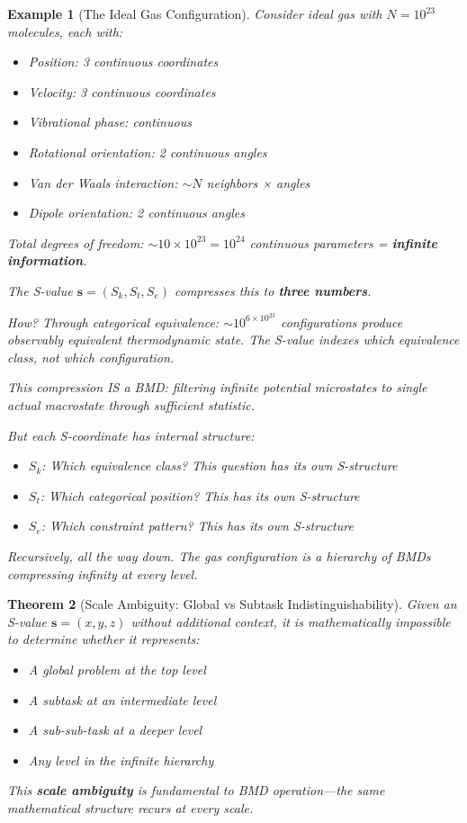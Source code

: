 \documentclass[12pt,a4paper]{article}
\newtheorem{theorem}{Theorem}[section]
\newtheorem{example}[theorem]{Example}
\begin{document}
\begin{example}[The Ideal Gas Configuration]
Consider ideal gas with $N = 10^{23}$ molecules, each with:
\begin{itemize}
\item Position: 3 continuous coordinates
\item Velocity: 3 continuous coordinates  
\item Vibrational phase: continuous
\item Rotational orientation: 2 continuous angles
\item Van der Waals interaction: $\sim N$ neighbors × angles
\item Dipole orientation: 2 continuous angles
\end{itemize}

Total degrees of freedom: $\sim 10 \times 10^{23} = 10^{24}$ continuous parameters = \textbf{infinite information}.

The S-value $\mathbf{s} = (S_k, S_t, S_e)$ compresses this to \textbf{three numbers}.

How? Through categorical equivalence: $\sim 10^{6 \times 10^{23}}$ configurations produce observably equivalent thermodynamic state. The S-value indexes which equivalence class, not which configuration.

This compression IS a BMD: filtering infinite potential microstates to single actual macrostate through sufficient statistic.

But each S-coordinate has internal structure:
\begin{itemize}
\item $S_k$: Which equivalence class? This question has its own S-structure
\item $S_t$: Which categorical position? This has its own S-structure  
\item $S_e$: Which constraint pattern? This has its own S-structure
\end{itemize}

Recursively, all the way down. The gas configuration is a hierarchy of BMDs compressing infinity at every level.
\end{example}

\begin{theorem}[Scale Ambiguity: Global vs Subtask Indistinguishability]
\label{thm:scale_ambiguity}
Given an S-value $\mathbf{s} = (x, y, z)$ without additional context, it is mathematically impossible to determine whether it represents:
\begin{itemize}
\item A global problem at the top level
\item A subtask at an intermediate level
\item A sub-sub-task at a deeper level
\item Any level in the infinite hierarchy
\end{itemize}

This \textbf{scale ambiguity} is fundamental to BMD operation—the same mathematical structure recurs at every scale.
\end{theorem}
\end{document}
